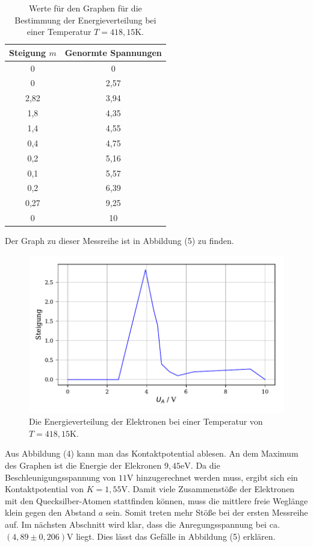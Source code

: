 \begin{table}[H]
  \centering
  \caption{Werte für den Graphen für die Bestimmung der Energieverteilung bei einer Temperatur $T=418,15$K.}
  \label{tab:Parameter}
  \begin{tabular}{c c}
    \toprule
    Steigung $m$ &  Genormte Spannungen \\
    \bottomrule
    0 & 0\\
    0 & 2,57\\
    2,82 & 3,94\\
    1,8 &4,35\\
    1,4 &4,55\\
    0,4 &4,75\\
    0,2 &5,16\\
    0,1 &5,57\\
    0,2&6,39\\
    0,27 &9,25\\
    0 &10\\
  
    \bottomrule
  \end{tabular}
\end{table}

Der Graph zu dieser Messreihe ist in Abbildung (5) zu finden.

\begin{figure}[H]
  \centering
  \includegraphics{plota2.pdf}
  \caption{Die Energieverteilung der Elektronen bei einer Temperatur von $T=418,15$K.}
  \label{fig:plot}
\end{figure}

\noindent Aus Abbildung (4) kann man das Kontaktpotential ablesen. 
An dem Maximum des Graphen ist die Energie der Elekronen $9,45\si{\eV}$.
Da die Beschleunigungsspannung von $11\si{\V}$ hinzugerechnet werden muss, ergibt sich
ein Kontaktpotential von $K = 1,55 \si{\V}$.
Damit viele Zusammenstöße der Elektronen mit den Quecksilber-Atomen stattfinden können, muss die mittlere freie Weglänge klein gegen den Abstand $a$ sein.
Somit treten mehr Stöße bei der ersten Messreihe auf.
Im nächsten Abschnitt wird klar, dass die Anregungsspannung bei ca. $ (4,89 \pm 0,206) \si{\V}$ liegt. Dies lässt das Gefälle in Abbildung (5) erklären.

